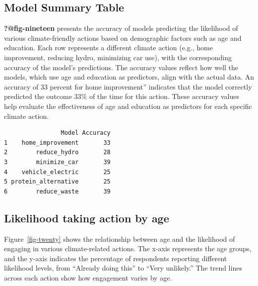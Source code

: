 \documentclass[
  letterpaper,
  DIV=11,
  numbers=noendperiod]{scrartcl}
\begin{document}
\subsection{Model Summary Table}\label{model-summary-table}

\textbf{?@fig-nineteen} presents the accuracy of models predicting the
likelihood of various climate-friendly actions based on demographic
factors such as age and education. Each row represents a different
climate action (e.g., home improvement, reducing hydro, minimizing car
use), with the corresponding accuracy of the model's predictions. The
accuracy values reflect how well the models, which use age and education
as predictors, align with the actual data. An accuracy of 33 percent for
home improvement'' indicates that the model correctly predicted the
outcome 33\% of the time for this action. These accuracy values help
evaluate the effectiveness of age and education as predictors for each
specific climate action.

\begin{verbatim}
                Model Accuracy
1    home_improvement       33
2        reduce_hydro       28
3        minimize_car       39
4    vehicle_electric       25
5 protein_alternative       25
6        reduce_waste       39
\end{verbatim}

\subsection{Likelihood taking action by
age}\label{likelihood-taking-action-by-age}

Figure~\ref{fig-twenty} shows the relationship between age and the
likelihood of engaging in various climate-related actions. The x-axis
represents the age groups, and the y-axis indicates the percentage of
respondents reporting different likelihood levels, from ``Already doing
this'' to ``Very unlikely.'' The trend lines across each action show how
engagement varies by age.
\end{document}

